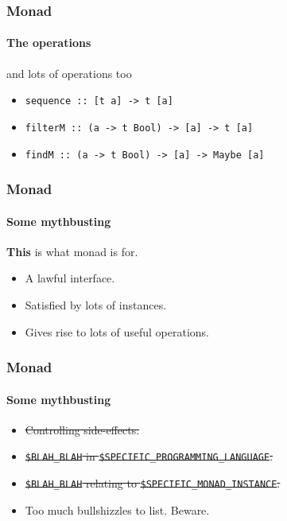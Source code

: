 \begin{frame}[fragile]
\frametitle{Monad}
\framesubtitle{The operations}
\begin{block}{and lots of operations too}
\begin{itemize}
\item \lstinline{sequence :: [t a] -> t [a]}
\item \lstinline{filterM :: (a -> t Bool) -> [a] -> t [a]}
\item \lstinline{findM :: (a -> t Bool) -> [a] -> Maybe [a]}
\end{itemize}
\end{block}
\end{frame}

\begin{frame}[fragile]
\frametitle{Monad}
\framesubtitle{Some mythbusting}
\begin{center}
\textbf{This} is what monad is for.
\end{center}
\begin{center}
\begin{itemize}
\item A lawful interface.
\item Satisfied by lots of instances.
\item Gives rise to lots of useful operations.
\end{itemize}
\end{center}
\end{frame}

\begin{frame}[fragile]
\frametitle{Monad}
\framesubtitle{Some mythbusting}
\begin{itemize}
\item<1-> \sout{Controlling side-effects.}
\item<2-> \sout{\lstinline{$BLAH_BLAH} in \lstinline{$SPECIFIC_PROGRAMMING_LANGUAGE}.}
\item<3-> \sout{\lstinline{$BLAH_BLAH} relating to \lstinline{$SPECIFIC_MONAD_INSTANCE}.}
\item<4-> Too much bullshizzles to list. Beware.
\end{itemize}
\end{frame}
